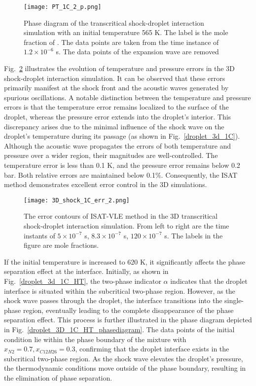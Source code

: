 \begin{figure}[htbp]
\centering
\texttt{[image: PT\_1C\_2\_p.png]}
\caption{Phase diagram of the transcritical shock-droplet interaction simulation with an initial temperature 565 K. The label is the mole fraction of . The data points are taken from the time instance of $1.2\times 10^{-6}$ s. The data points of the expansion wave are removed}
\label{droplet_3D_1C_phasediagram} 
\end{figure}

Fig.~\ref{SD_3D_err} illustrates the evolution of temperature and pressure errors in the 3D shock-droplet interaction simulation. It can be observed that these errors primarily manifest at the shock front and the acoustic waves generated by spurious oscillations. A notable distinction between the temperature and pressure errors is that the temperature error remains localized to the surface of the droplet, whereas the pressure error extends into the droplet's interior. This discrepancy arises due to the minimal influence of the shock wave on the droplet's temperature during its passage (as shown in Fig.~\ref{droplet_3d_1C}). Although the acoustic wave propagates the errors of both temperature and pressure over a wider region, their magnitudes are well-controlled. The temperature error is less than 0.1 K, and the pressure error remains below 0.2 bar. Both relative errors are maintained below 0.1\%. Consequently, the ISAT method demonstrates excellent error control in the 3D simulations.



\begin{figure}[htbp]
\centering
\texttt{[image: 3D\_shock\_1C\_err\_2.png]}
\caption{The error contours of ISAT-VLE method in the 3D transcritical shock-droplet interaction simulation. From left to right are the time instants of $5\times 10^{-7}$ s, $8.3\times 10^{-7}$ s, $120\times 10^{-7}$ s. The labels in the figure are mole fractions.}
\label{SD_3D_err} 
\end{figure}

If the initial temperature is increased to 620 K, it significantly affects the phase separation effect at the interface. Initially, as shown in Fig.~\ref{droplet_3d_1C_HT}, the two-phase indicator $\alpha$ indicates that the droplet interface is situated within the subcritical two-phase region. However, as the shock wave passes through the droplet, the interface transitions into the single-phase region, eventually leading to the complete disappearance of the phase separation effect. This process is further illustrated in the phase diagram depicted in Fig.~\ref{droplet_3D_1C_HT_phasediagram}. The data points of the initial condition lie within the phase boundary of the mixture with $x_{N2}=0.7, x_{C12H26}=0.3$, confirming that the droplet interface exists in the subcritical two-phase region. As the shock wave elevates the droplet's pressure, the thermodynamic conditions move outside of the phase boundary, resulting in the elimination of phase separation. 

